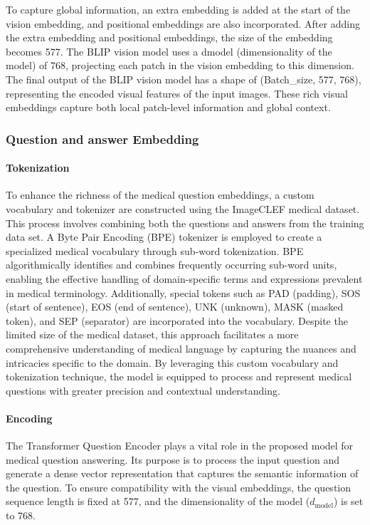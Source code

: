 \documentclass[pdflatex,sn-mathphys-num]{sn-jnl}%
\begin{document}
To capture global information, an extra embedding is added at the start of the vision embedding, and positional embeddings are also incorporated. After adding the extra embedding and positional embeddings, the size of the embedding becomes 577. The BLIP vision model uses a dmodel (dimensionality of the model) of 768, projecting each patch in the vision embedding to this dimension. The final output of the BLIP vision model has a shape of (Batch\_size, 577, 768), representing the encoded visual features of the input images. These rich visual embeddings capture both local patch-level information and global context.

\subsubsection{Question and answer Embedding}\label{subsubsec3.4.2}

\paragraph{Tokenization}
To enhance the richness of the medical question embeddings, a custom vocabulary and tokenizer are constructed using the ImageCLEF medical dataset. This process involves combining both the questions and answers from the training data set. A Byte Pair Encoding (BPE) tokenizer is employed to create a specialized medical vocabulary through sub-word tokenization. BPE algorithmically identifies and combines frequently occurring sub-word units, enabling the effective handling of domain-specific terms and expressions prevalent in medical terminology. Additionally, special tokens such as PAD (padding), SOS (start of sentence), EOS (end of sentence), UNK (unknown), MASK (masked token), and SEP (separator) are incorporated into the vocabulary. Despite the limited size of the medical dataset, this approach facilitates a more comprehensive understanding of medical language by capturing the nuances and intricacies specific to the domain. By leveraging this custom vocabulary and tokenization technique, the model is equipped to process and represent medical questions with greater precision and contextual understanding.

\paragraph{Encoding}
The Transformer\cite{vaswani2023attention} Question Encoder plays a vital role in the proposed model for medical question answering. Its purpose is to process the input question and generate a dense vector representation that captures the semantic information of the question. To ensure compatibility with the visual embeddings, the question sequence length is fixed at 577, and the dimensionality of the model ($d_{\mathrm{model}}$) is set to 768.
\end{document}

